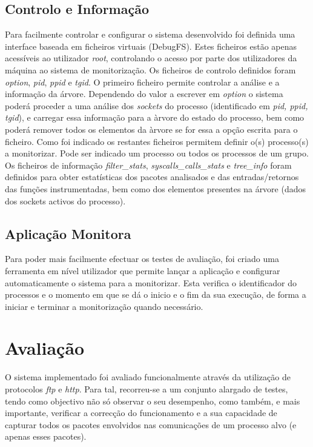 \documentclass[a4paper]{llncs}
\begin{document}
\subsection*{Controlo e Informação}
\label{sub:data_information}

Para facilmente controlar e configurar o sistema desenvolvido foi definida uma interface baseada em ficheiros virtuais (DebugFS). Estes ficheiros estão apenas acessíveis ao utilizador \textit{root}, controlando o acesso por parte dos utilizadores da máquina ao sistema de monitorização. Os ficheiros de controlo definidos foram \textit{option}, \textit{pid}, \textit{ppid} e \textit{tgid}. O primeiro ficheiro permite controlar a análise e a informação da árvore. Dependendo do valor a escrever em \textit{option} o sistema poderá proceder a uma análise dos \textit{sockets} do processo (identificado em \textit{pid, ppid, tgid}), e carregar essa informação para a àrvore do estado do processo, bem como poderá remover todos os elementos da àrvore se for essa a opção escrita para o ficheiro. Como foi indicado os restantes ficheiros permitem definir o(s) processo(s) a monitorizar. Pode ser indicado um processo ou todos os processos de um grupo. Os ficheiros de informação \textit{filter\_stats},  \textit{syscalls\_calls\_stats} e \textit{tree\_info} foram definidos para obter estatísticas dos pacotes analisados e das entradas/retornos das funções instrumentadas, bem como dos elementos presentes na árvore (dados dos sockets activos do processo).


\subsection{Aplicação Monitora}
\label{sub:monitor_app}

Para poder mais facilmente efectuar os testes de avaliação, foi criado uma ferramenta em nível utilizador que permite lançar a aplicação e configurar automaticamente o sistema para a monitorizar. Esta verifica o identificador do processos e o momento em que se dá o inicio e o fim da sua execução, de forma a iniciar e terminar a monitorização quando necessário.



\section{Avaliação}
\label{sec:evaluation}

O sistema implementado foi avaliado funcionalmente através da utilização de protocolos \textit{ftp} e \textit{http}. Para tal, recorreu-se a um conjunto alargado de testes, tendo como objectivo não só observar o seu desempenho, como também, e mais importante, verificar a correcção do funcionamento e a sua capacidade de capturar todos os pacotes envolvidos nas comunicações de um processo alvo (e apenas esses pacotes). 
\end{document}
